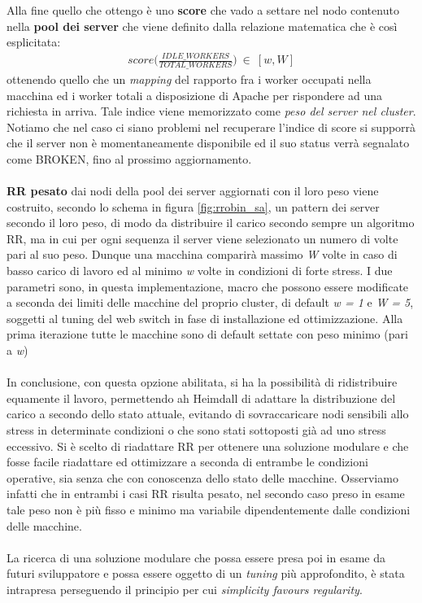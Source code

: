 \documentclass[italian]{tktltiki2}
\begin{document}
Alla fine quello che ottengo è uno \textbf{score} che vado a settare nel nodo contenuto nella \textbf{pool dei server} che viene definito dalla relazione matematica che è così esplicitata:
\begin{align*}
  score\Big(\frac{IDLE\_WORKERS}{TOTAL\_WORKERS}\Big) ~ \in ~ [w, W]
\end{align*}
ottenendo quello che un \emph{mapping} del rapporto fra i worker occupati nella macchina ed i worker totali a disposizione di Apache per rispondere ad una richiesta in arriva. Tale indice viene memorizzato come \emph{peso del server nel cluster}.\\
Notiamo che nel caso ci siano problemi nel recuperare l'indice di score si supporrà che il server non è momentaneamente disponibile ed il suo status verrà segnalato come BROKEN, fino al prossimo aggiornamento.\\\\
\textbf{RR pesato} dai nodi della pool dei server aggiornati con il loro peso viene costruito, secondo lo schema in figura \ref{fig:rrobin_sa}, un pattern dei server secondo il loro peso, di modo da distribuire il carico secondo sempre un algoritmo RR, ma in cui per ogni sequenza il server viene selezionato un numero di volte pari al suo peso. Dunque una macchina comparirà massimo \emph{W} volte in caso di basso carico di lavoro ed al minimo \emph{w} volte in condizioni di forte stress. I due parametri sono, in questa implementazione, macro che possono essere modificate a seconda dei limiti delle macchine del proprio cluster, di default \emph{w = 1} e \emph{W = 5}, soggetti al tuning del web switch in fase di installazione ed ottimizzazione. Alla prima iterazione tutte le macchine sono di default settate con peso minimo (pari a \emph{w})\\\\
In conclusione, con questa opzione abilitata, si ha la possibilità di ridistribuire equamente il lavoro, permettendo ah Heimdall di adattare la distribuzione del carico a secondo dello stato attuale, evitando di sovraccaricare nodi sensibili allo stress in determinate condizioni o che sono stati sottoposti già ad uno stress eccessivo. Si è scelto di riadattare RR per ottenere una soluzione modulare e che fosse facile riadattare ed ottimizzare a seconda di entrambe le condizioni operative, sia senza che con conoscenza dello stato delle macchine. Osserviamo infatti che in entrambi i casi RR risulta pesato, nel secondo caso preso in esame tale peso non è più fisso e minimo ma variabile dipendentemente dalle condizioni delle macchine.\\\\
La ricerca di una soluzione modulare che possa essere presa poi in esame da futuri sviluppatore e possa essere oggetto di un \emph{tuning} più approfondito, è stata intrapresa perseguendo il principio per cui \emph{simplicity favours regularity}.
\end{document}
